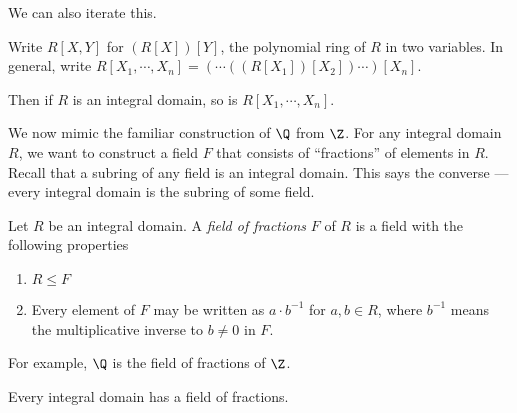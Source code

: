 \documentclass[a4paper]{article}
\begin{document}
We can also iterate this.

\begin{notation}
  Write $R[X, Y]$ for $(R[X])[Y]$, the polynomial ring of $R$ in two variables. In general, write $R[X_1, \cdots, X_n] = (\cdots((R[X_1])[X_2]) \cdots )[X_n]$.
\end{notation}

Then if $R$ is an integral domain, so is $R[X_1, \cdots, X_n]$.

We now mimic the familiar construction of $\Q$ from $\Z$. For any integral domain $R$, we want to construct a field $F$ that consists of ``fractions'' of elements in $R$. Recall that a subring of any field is an integral domain. This says the converse --- every integral domain is the subring of some field.

\begin{defi}
  Let $R$ be an integral domain. A \emph{field of fractions} $F$ of $R$ is a field with the following properties
  \begin{enumerate}
    \item $R \leq F$
    \item Every element of $F$ may be written as $a \cdot b^{-1}$ for $a, b \in R$, where $b^{-1}$ means the multiplicative inverse to $b \not= 0$ in $F$.
  \end{enumerate}
\end{defi}
For example, $\Q$ is the field of fractions of $\Z$.

\begin{thm}
  Every integral domain has a field of fractions.
\end{thm}
\end{document}
